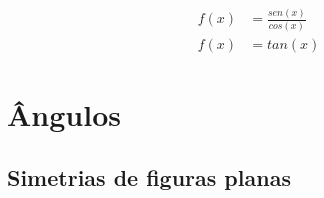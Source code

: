 \begin{multicols*}{2}
    \color{black}
    \begin{align}
        f(x) &= \frac{sen(x)}{cos(x)} \\[10pt]
        f(x) &= tan(x)
    \end{align}
    \color{mediumgray}

    \newpage
    \section*{Ângulos}
    \lipsum[1]

    \subsection*{Simetrias de figuras planas}
    \lipsum[1-2]    
    
\end{multicols*}